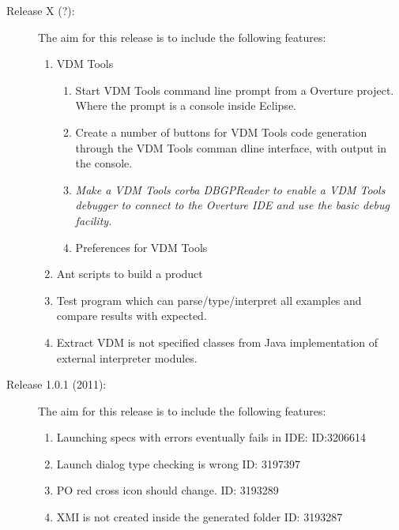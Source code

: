 \documentclass{overturerep}
\newcommand{\markDone}[1]{{\color{Gray}#1}}
\newcommand{\markDeleted}[1]{{\color{Maroon}\textit{#1}}}
\begin{document}
\begin{description}
\item[Release X (?):] The aim for this release is to
  include the following features:  
\begin{enumerate}
\item \markDone{ VDM Tools
	\begin{enumerate}
		\item Start VDM Tools command line prompt from a Overture project. Where the prompt is a console inside Eclipse.
		
		\item Create a number of buttons for VDM Tools code generation through the VDM Tools comman dline interface, with output in the console.
		
		\item \markDeleted{ Make a VDM Tools corba DBGPReader to enable a VDM Tools debugger to connect to the Overture IDE and use the basic debug facility.}
		\item Preferences for VDM Tools
	\end{enumerate}
      }




\item \markDone{Ant scripts to build a product}
\item \markDone{Test program which can parse/type/interpret all examples and compare results with expected.}
\item \markDone{Extract VDM is not specified classes from Java implementation of external interpreter modules.}

\end{enumerate}
\end{description}


\begin{description}
\item[Release 1.0.1 (2011):] The aim for this release is to
  include the following features:  
\begin{enumerate}

\item Launching specs with errors eventually fails in IDE: ID:3206614
\item Launch dialog type checking is wrong ID: 3197397
\item PO red cross icon should change. ID: 3193289
\item XMI is not created inside the generated folder ID: 3193287
\end{enumerate}
\end{description}
\end{document}

